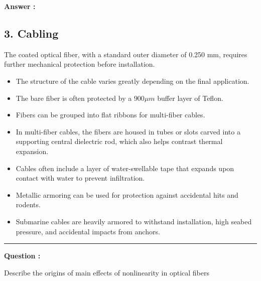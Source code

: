\documentclass[a4paper,11pt]{book}
\newcounter{qacount}
\newenvironment{question}{
  \refstepcounter{qacount}
  \vspace{1em} %
  \noindent\textbf{Question \theqacount:}\space
}{
  \par %
}
\newenvironment{answer}{
  \noindent\textbf{Answer \theqacount:}\space
}{
  \par\vspace{1em}   %
  \hrule             %
  \vspace{0.5em}     %
}
\begin{document}
\begin{answer}
    \subsection*{3. Cabling}
    The coated optical fiber, with a standard outer diameter of 0.250 mm, requires further mechanical protection before installation.
    \begin{itemize}
        \item The structure of the cable varies greatly depending on the final application.
        \item The bare fiber is often protected by a $900 \mu m$ buffer layer of Teflon.
        \item Fibers can be grouped into flat ribbons for multi-fiber cables.
        \item In multi-fiber cables, the fibers are housed in tubes or slots carved into a supporting central dielectric rod, which also helps contrast thermal expansion.
        \item Cables often include a layer of water-swellable tape that expands upon contact with water to prevent infiltration.
        \item Metallic armoring can be used for protection against accidental hits and rodents.
        \item Submarine cables are heavily armored to withstand installation, high seabed pressure, and accidental impacts from anchors.
    \end{itemize}
\end{answer}

\begin{question}
    Describe the origins of main effects of nonlinearity in optical fibers
\end{question}
\end{document}
